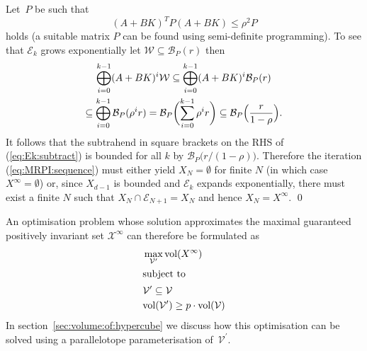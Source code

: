 \documentclass{ifacconf}
\def\epf{\hfill \mbox{\qed}}%
\providecommand{\vol}{\text{vol}}
\providecommand{\B}{\mathcal B}
\providecommand{\Xinfty}{{\mathscr X}^\infty}
\providecommand{\E}{\mathcal E}
\providecommand{\W}{\mathcal W}
\providecommand{\V}{\mathcal V}
\begin{document}
Let~$P$ be such that 
\[
(A+BK)^TP(A+BK) \leq \rho^2P
\]
holds (a suitable matrix $P$ can be found using semi-definite programming).
%
To see that $\E_k$ grows exponentially let $\W\subseteq\B_P(r)$ then
%
\begin{multline*}
  \bigoplus_{i=0}^{k-1}(A+BK)^i\W \subseteq \bigoplus_{i=0}^{k-1}(A+BK)^i\B_P(r)\\
  \subseteq\bigoplus_{i=0}^{k-1}\B_P(\rho^i r) = \B_P\biggl(\sum_{i=0}^{k-1}\rho^i r\biggr)\subseteq\B_P\Bigl(\frac{r}{1-\rho}\Bigr) .
\end{multline*}
%
It follows that the subtrahend in square brackets on the RHS of (\ref{eq:Ek:subtract}) is bounded for all $k$ by $\B_P\bigl(r / (1-\rho)\bigr)$.
%
Therefore 
the iteration (\ref{eq:MRPI:sequence}) must either yield $X_N = \emptyset$ for finite $N$
(in which case $X^\infty=\emptyset$) or,
since $X_{d-1}$ is bounded and $\E_k$ expands exponentially, there must exist a finite $N$ such that $X_{N}\cap\E_{N+1}=X_N$ and hence $X_N=X^\infty$.
%
\epf

An optimisation problem whose solution approximates the maximal guaranteed positively invariant set $\Xinfty$ can therefore be formulated as
%
\begin{subequations}\label{seq:optimisation:MRPI:abstract}
\begin{align}
		& \max_{\V^\prime} \vol(X^\infty) \\
%
\intertext{subject to}
%
	& \V^\prime\subseteq\V \\
	& \vol(\V^\prime)\geq p\cdot\vol(\V)
\end{align}
\end{subequations}
%
In section~\ref{sec:volume:of:hypercube} we discuss how this optimisation can be solved using a parallelotope parameterisation of~$\V^\prime$.
\end{document}
